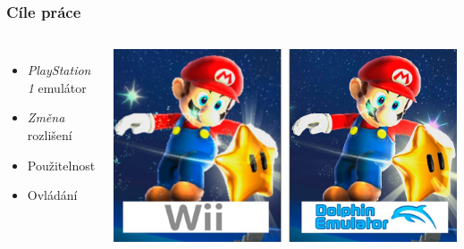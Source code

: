 




\begin{frame}
  \frametitle{Cíle práce}
  \begin{columns}
    \begin{itemize}
        \item \emph{PlayStation 1} emulátor
        \item \emph{Změna} rozlišení
        \item Použitelnost
        \item Ovládání
    \end{itemize}
     
        \includegraphics[width=\textwidth]{img/dolphin-resolution.jpg}
  \end{columns}
\end{frame}


